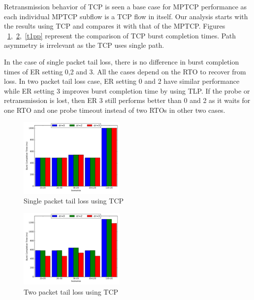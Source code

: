 \documentclass[10pt,draftcls,twocolumn]{IEEEconf}
\begin{document}
Retransmission behavior of TCP is seen a base case for MPTCP performance as each individual MPTCP subflow is a TCP flow in itself. Our analysis
starts with the results using TCP and compares it with that of the MPTCP. Figures ~\ref{t1p},~\ref{t2p},~\ref{t1pp} represent the comparison of TCP 
burst completion times. Path asymmetry is irrelevant as the TCP uses single path.

In the case of single packet tail loss, there is no difference in burst completion times of ER setting 0,2 and 3. All the cases depend on the RTO
to recover from loss. In two packet tail loss case, ER setting 0 and 2 have similar performance while ER setting 3 improves burst completion time
by using TLP. If the probe or retransmission is lost, then ER 3 still performs better than 0 and 2 as it waits for one RTO and one probe timeout
instead of two RTOs in other two cases.

\begin{figure}[!ht]
\begin{center}
\includegraphics[angle=0, width=0.46\textwidth,natwidth=578.16,natheight=433.62]{plots/T1P.pdf}
\caption{Single packet tail loss using TCP}\label{t1p}
\end{center}
\end{figure}



\begin{figure}[!ht]
\begin{center}
\includegraphics[angle=0, width=0.46\textwidth,natwidth=578.16,natheight=433.62]{plots/T2P.pdf}
\caption{Two packet tail loss using TCP}\label{t2p}
\end{center}
\end{figure}
\end{document}
